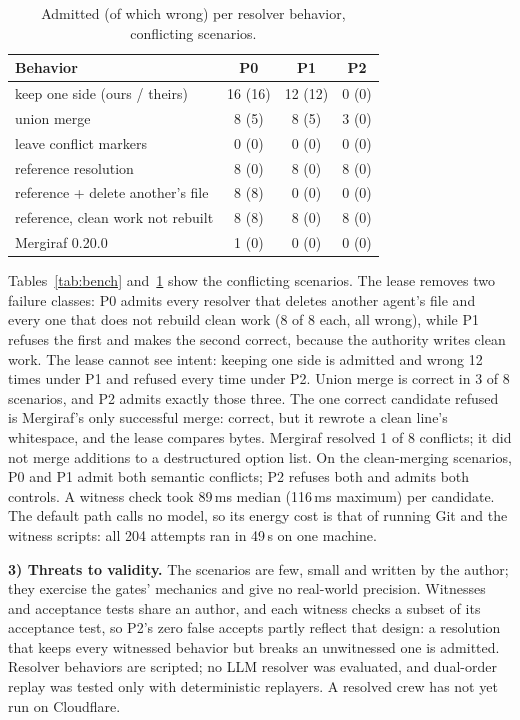 \documentclass[10pt,conference]{IEEEtran}
\begin{document}
\begin{table}[t]
\caption{Admitted (of which wrong) per resolver behavior, conflicting scenarios.}
\label{tab:behavior}
\centering
\begin{tabular}{@{}lccc@{}}
\toprule
Behavior & P0 & P1 & P2\\
\midrule
keep one side (ours / theirs) & 16 (16) & 12 (12) & 0 (0)\\
union merge & 8 (5) & 8 (5) & 3 (0)\\
leave conflict markers & 0 (0) & 0 (0) & 0 (0)\\
reference resolution & 8 (0) & 8 (0) & 8 (0)\\
reference + delete another's file & 8 (8) & 0 (0) & 0 (0)\\
reference, clean work not rebuilt & 8 (8) & 8 (0) & 8 (0)\\
Mergiraf 0.20.0 & 1 (0) & 0 (0) & 0 (0)\\
\bottomrule
\end{tabular}
\end{table}

Tables~\ref{tab:bench} and~\ref{tab:behavior} show the conflicting scenarios. The lease removes two failure classes: P0 admits every resolver that deletes another agent's file and every one that does not rebuild clean work (8 of 8 each, all wrong), while P1 refuses the first and makes the second correct, because the authority writes clean work. The lease cannot see intent: keeping one side is admitted and wrong 12 times under P1 and refused every time under P2. Union merge is correct in 3 of 8 scenarios, and P2 admits exactly those three. The one correct candidate refused is Mergiraf's only successful merge: correct, but it rewrote a clean line's whitespace, and the lease compares bytes. Mergiraf resolved 1 of 8 conflicts; it did not merge additions to a destructured option list. On the clean-merging scenarios, P0 and P1 admit both semantic conflicts; P2 refuses both and admits both controls. A witness check took 89\,ms median (116\,ms maximum) per candidate. The default path calls no model, so its energy cost is that of running Git and the witness scripts: all 204 attempts ran in 49\,s on one machine.

\textbf{3) Threats to validity.} The scenarios are few, small and written by the author; they exercise the gates' mechanics and give no real-world precision. Witnesses and acceptance tests share an author, and each witness checks a subset of its acceptance test, so P2's zero false accepts partly reflect that design: a resolution that keeps every witnessed behavior but breaks an unwitnessed one is admitted. Resolver behaviors are scripted; no LLM resolver was evaluated, and dual-order replay was tested only with deterministic replayers. A resolved crew has not yet run on Cloudflare.
\end{document}

